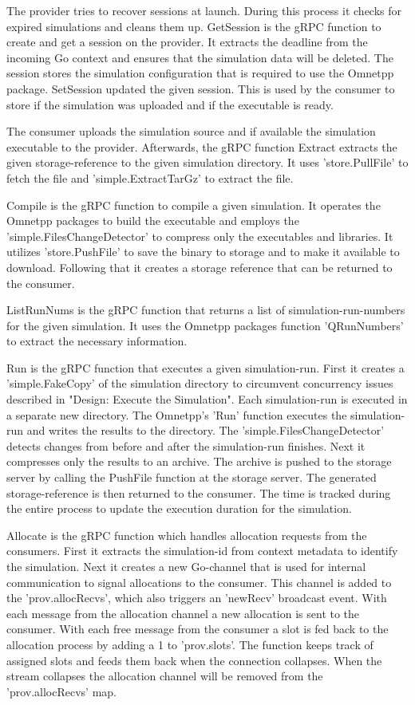 The provider tries to recover sessions at launch. During this process it checks for expired simulations and cleans them up. GetSession is the gRPC function to create and get a session on the provider. It extracts the deadline from the incoming Go context and ensures that the simulation data will be deleted. The session stores the simulation configuration that is required to use the Omnetpp package. SetSession updated the given session. This is used by the consumer to store if the simulation was uploaded and if the executable is ready.

The consumer uploads the simulation source and if available the simulation executable to the provider. Afterwards, the gRPC function Extract extracts the given storage-reference to the given simulation directory. It uses  'store.PullFile' to fetch the file and 'simple.ExtractTarGz' to extract the file.

Compile is the gRPC function to compile a given simulation. It operates the Omnetpp packages to build the executable and employs the 'simple.FilesChangeDetector' to compress only the executables and libraries. It utilizes 'store.PushFile' to save the binary to storage and to make it available to download. Following that it creates a storage reference that can be returned to the consumer.

ListRunNums is the gRPC function that returns a list of simulation-run-numbers for the given simulation. It uses the Omnetpp packages function 'QRunNumbers' to extract the necessary information.

Run is the gRPC function that executes a given simulation-run. First it creates a 'simple.FakeCopy' of the simulation directory to circumvent concurrency issues described in "Design: Execute the Simulation". Each simulation-run is executed in a separate new directory. The Omnetpp's 'Run' function executes the simulation-run and writes the results to the directory. The 'simple.FilesChangeDetector' detects changes from before and after the simulation-run finishes. Next it compresses only the results to an archive. The archive is pushed to the storage server by calling the PushFile function at the storage server. The generated storage-reference is then returned to the consumer. The time is tracked during the entire process to update the execution duration for the simulation.

Allocate is the gRPC function which handles allocation requests from the consumers. First it extracts the simulation-id from context metadata to identify the simulation. Next it creates a new Go-channel that is used for internal communication to signal allocations to the consumer. This channel is added to the 'prov.allocRecvs', which also triggers an 'newRecv' broadcast event. With each message from the allocation channel a new allocation is sent to the consumer. With each free message from the consumer a slot is fed back to the allocation process by adding a 1 to 'prov.slots'. The function keeps track of assigned slots and feeds them back when the connection collapses. When the stream collapses the allocation channel will be removed from the 'prov.allocRecvs' map.

